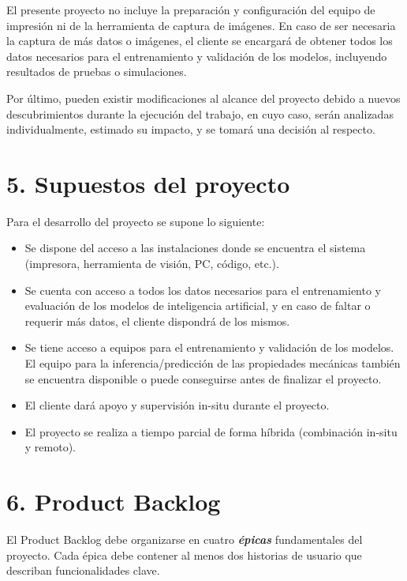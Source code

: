 \documentclass[
11pt, %
]{charter}
\begin{document}
El presente proyecto no incluye la preparación y configuración del equipo de impresión ni de la herramienta de captura de imágenes. En caso de ser necesaria la captura de más datos o imágenes, el cliente se encargará de obtener todos los datos necesarios para el entrenamiento y validación de los modelos, incluyendo resultados de pruebas o simulaciones. 

Por último, pueden existir modificaciones al alcance del proyecto debido a nuevos descubrimientos durante la ejecución del trabajo, en cuyo caso, serán analizadas individualmente, estimado su impacto, y se tomará una decisión al respecto.


\section{5. Supuestos del proyecto}
\label{sec:supuestos}

Para el desarrollo del proyecto se supone lo siguiente:

\begin{itemize}
	\item Se dispone del acceso a las instalaciones donde se encuentra el sistema (impresora, herramienta de visión, PC, código, etc.).
	\item Se cuenta con acceso a todos los datos necesarios para el entrenamiento y evaluación de los modelos de inteligencia artificial, y en caso de faltar o requerir más datos, el cliente dispondrá de los mismos.
	\item Se tiene acceso a equipos para el entrenamiento y validación de los modelos. El equipo para la inferencia/predicción de las propiedades mecánicas también se encuentra disponible o puede conseguirse antes de finalizar el proyecto.
    \item El cliente dará apoyo y supervisión in-situ durante el proyecto.
    \item El proyecto se realiza a tiempo parcial de forma híbrida (combinación in-situ y remoto).
\end{itemize}



\section{6. Product Backlog}
\label{sec:backlog}

El Product Backlog debe organizarse en cuatro \textbf{\textit{\'{e}picas}} fundamentales del proyecto. Cada \'{e}pica debe contener al menos dos historias de usuario que describan funcionalidades clave.
\end{document}
